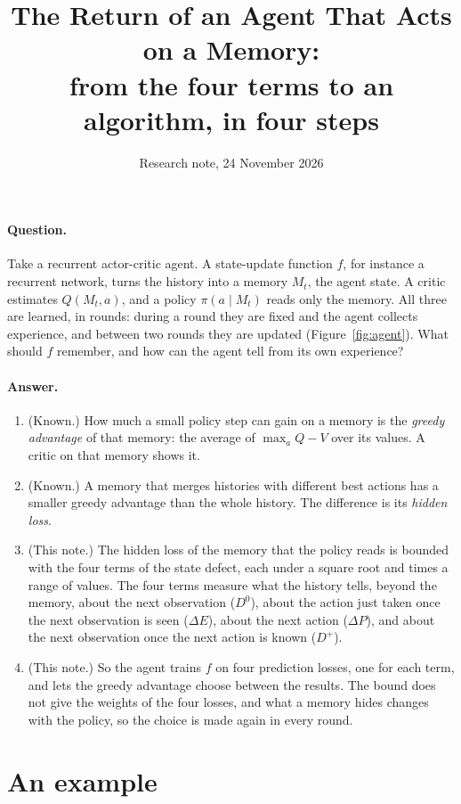 \documentclass[11pt]{article}
\title{The Return of an Agent That Acts on a Memory:\\ from the four terms to an algorithm, in four steps}
\author{}
\date{Research note, 24 November 2026}
\theoremstyle{definition}
\newcommand{\dE}{\Delta E}
\newcommand{\dP}{\Delta P}
\begin{document}
\maketitle

\paragraph{Question.} Take a recurrent actor-critic agent. A state-update function $f$, for instance a recurrent network, turns the history into a memory $M_t$, the agent state. A critic estimates $Q(M_t,a)$, and a policy $\pi(a\mid M_t)$ reads only the memory. All three are learned, in rounds: during a round they are fixed and the agent collects experience, and between two rounds they are updated (Figure~\ref{fig:agent}). What should $f$ remember, and how can the agent tell from its own experience?

\paragraph{Answer.}
\begin{enumerate}
\item (Known.) How much a small policy step can gain on a memory is the \emph{greedy advantage} of that memory: the average of $\max_aQ-V$ over its values. A critic on that memory shows it.
\item (Known.) A memory that merges histories with different best actions has a smaller greedy advantage than the whole history. The difference is its \emph{hidden loss}.
\item (This note.) The hidden loss of the memory that the policy reads is bounded with the four terms of the state defect, each under a square root and times a range of values. The four terms measure what the history tells, beyond the memory, about the next observation ($D^0$), about the action just taken once the next observation is seen ($\dE$), about the next action ($\dP$), and about the next observation once the next action is known ($D^+$).
\item (This note.) So the agent trains $f$ on four prediction losses, one for each term, and lets the greedy advantage choose between the results. The bound does not give the weights of the four losses, and what a memory hides changes with the policy, so the choice is made again in every round.
\end{enumerate}

\section{An example}\label{sec:example}
\end{document}
